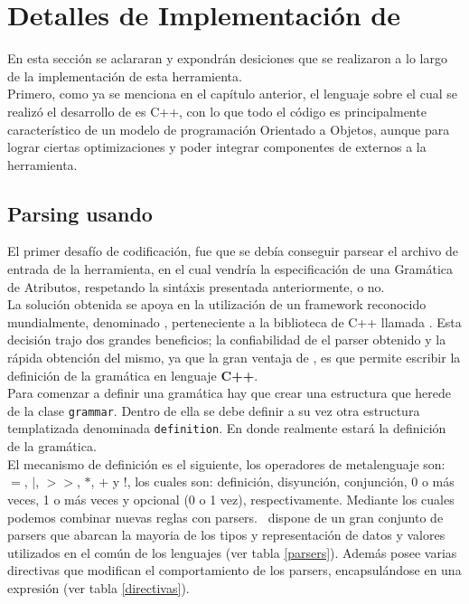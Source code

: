 \chapter{Detalles de Implementaci\'on de \maggen}
\label{chap:implem}
\minitoc

En esta sección se aclararan y expondrán desiciones que se realizaron a lo largo de la implementación de esta herramienta.\\
Primero, como ya se menciona en el capítulo anterior, el lenguaje sobre el cual se realizó el desarrollo de \maggen es C++, con lo que todo el código es principalmente característico de un modelo de programación Orientado a Objetos, aunque para lograr ciertas optimizaciones y poder integrar componentes de externos a la herramienta.

\section{Parsing usando \boost \ \spirit}

El primer desafío de codificación, fue que se debía conseguir parsear el archivo de entrada de la herramienta, en el cual vendría la especificación de una Gramática de Atributos, respetando la sintáxis presentada anteriormente, o no.\\
La solución obtenida se apoya en la utilización de un framework reconocido mundialmente, denominado \spirit, perteneciente a la biblioteca de C++ llamada \boost. Esta decisión trajo dos grandes beneficios; la confiabilidad de el parser obtenido y la rápida obtención del mismo, ya que la gran ventaja de \spirit, es que permite escribir la definición de la gramática en lenguaje \textbf{C++}.\\
Para comenzar a definir una gramática hay que crear una estructura que herede de la clase \texttt{grammar}. Dentro de ella se debe definir a su vez otra estructura templatizada denominada \texttt{definition}. En donde realmente estará la definición de la gramática.\\
El mecanismo de definición es el siguiente, los operadores de metalenguaje son: \texttt{$=$}, \texttt{$|$}, \texttt{$>>$}, \texttt{$*$}, \texttt{$+$} y \texttt{$!$}, los cuales son: definición, disyunción, conjunción, 0 o más veces, 1 o más veces y opcional (0 o 1 vez), respectivamente. Mediante los cuales podemos combinar nuevas reglas con parsers. \spirit\ dispone de un gran conjunto de parsers que abarcan la mayoria de los tipos y representación de datos y valores utilizados en el común de los lenguajes (ver tabla \ref{parsers}). Además posee varias directivas que modifican el comportamiento de los parsers, encapsulándose en una expresión (ver tabla \ref{directivas}).

